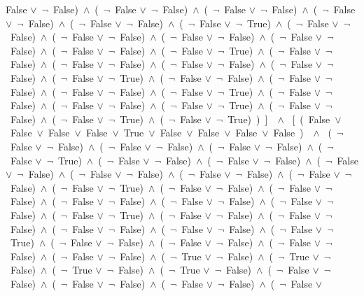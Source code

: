﻿\documentclass[a4paper,10pt]{article}
\begin{document}
False $\vee$\  $\neg$\ False)\ $\wedge$\ (\  $\neg$\ False $\vee$\  $\neg$\ False)\ $\wedge$\ (\  $\neg$\ False $\vee$\  $\neg$\ False)\ $\wedge$\ (\  $\neg$\ False $\vee$\  $\neg$\ False)\ $\wedge$\ (\  $\neg$\ False $\vee$\  $\neg$\ False)\ $\wedge$\ (\  $\neg$\ False $\vee$\  $\neg$\ True)\ $\wedge$\ (\  $\neg$\ False $\vee$\  $\neg$\ False)\ $\wedge$\ (\  $\neg$\ False $\vee$\  $\neg$\ False)\ $\wedge$\ (\  $\neg$\ False $\vee$\  $\neg$\ False)\ $\wedge$\ (\  $\neg$\ False $\vee$\  $\neg$\ False)\ $\wedge$\ (\  $\neg$\ False $\vee$\  $\neg$\ False)\ $\wedge$\ (\  $\neg$\ False $\vee$\  $\neg$\ True)\ $\wedge$\ (\  $\neg$\ False $\vee$\  $\neg$\ False)\ $\wedge$\ (\  $\neg$\ False $\vee$\  $\neg$\ False)\ $\wedge$\ (\  $\neg$\ False $\vee$\  $\neg$\ False)\ $\wedge$\ (\  $\neg$\ False $\vee$\  $\neg$\ False)\ $\wedge$\ (\  $\neg$\ False $\vee$\  $\neg$\ True)\ $\wedge$\ (\  $\neg$\ False $\vee$\  $\neg$\ False)\ $\wedge$\ (\  $\neg$\ False $\vee$\  $\neg$\ False)\ $\wedge$\ (\  $\neg$\ False $\vee$\  $\neg$\ False)\ $\wedge$\ (\  $\neg$\ False $\vee$\  $\neg$\ True)\ $\wedge$\ (\  $\neg$\ False $\vee$\  $\neg$\ False)\ $\wedge$\ (\  $\neg$\ False $\vee$\  $\neg$\ False)\ $\wedge$\ (\  $\neg$\ False $\vee$\  $\neg$\ True)\ $\wedge$\ (\  $\neg$\ False $\vee$\  $\neg$\ False)\ $\wedge$\ (\  $\neg$\ False $\vee$\  $\neg$\ True)\ $\wedge$\ (\  $\neg$\ False $\vee$\  $\neg$\ True)\ )\ ]\ \ $\wedge$ \ [\ (\ False\ $\vee$\ False\ $\vee$\ False\ $\vee$\ False\ $\vee$\ True\ $\vee$\ False\ $\vee$\ False\ $\vee$\ False\ $\vee$\ False\ )\ \ $\wedge$ \ (\  $\neg$\ False $\vee$\  $\neg$\ False)\ $\wedge$\ (\  $\neg$\ False $\vee$\  $\neg$\ False)\ $\wedge$\ (\  $\neg$\ False $\vee$\  $\neg$\ False)\ $\wedge$\ (\  $\neg$\ False $\vee$\  $\neg$\ True)\ $\wedge$\ (\  $\neg$\ False $\vee$\  $\neg$\ False)\ $\wedge$\ (\  $\neg$\ False $\vee$\  $\neg$\ False)\ $\wedge$\ (\  $\neg$\ False $\vee$\  $\neg$\ False)\ $\wedge$\ (\  $\neg$\ False $\vee$\  $\neg$\ False)\ $\wedge$\ (\  $\neg$\ False $\vee$\  $\neg$\ False)\ $\wedge$\ (\  $\neg$\ False $\vee$\  $\neg$\ False)\ $\wedge$\ (\  $\neg$\ False $\vee$\  $\neg$\ True)\ $\wedge$\ (\  $\neg$\ False $\vee$\  $\neg$\ False)\ $\wedge$\ (\  $\neg$\ False $\vee$\  $\neg$\ False)\ $\wedge$\ (\  $\neg$\ False $\vee$\  $\neg$\ False)\ $\wedge$\ (\  $\neg$\ False $\vee$\  $\neg$\ False)\ $\wedge$\ (\  $\neg$\ False $\vee$\  $\neg$\ False)\ $\wedge$\ (\  $\neg$\ False $\vee$\  $\neg$\ True)\ $\wedge$\ (\  $\neg$\ False $\vee$\  $\neg$\ False)\ $\wedge$\ (\  $\neg$\ False $\vee$\  $\neg$\ False)\ $\wedge$\ (\  $\neg$\ False $\vee$\  $\neg$\ False)\ $\wedge$\ (\  $\neg$\ False $\vee$\  $\neg$\ False)\ $\wedge$\ (\  $\neg$\ False $\vee$\  $\neg$\ True)\ $\wedge$\ (\  $\neg$\ False $\vee$\  $\neg$\ False)\ $\wedge$\ (\  $\neg$\ False $\vee$\  $\neg$\ False)\ $\wedge$\ (\  $\neg$\ False $\vee$\  $\neg$\ False)\ $\wedge$\ (\  $\neg$\ False $\vee$\  $\neg$\ False)\ $\wedge$\ (\  $\neg$\ True $\vee$\  $\neg$\ False)\ $\wedge$\ (\  $\neg$\ True $\vee$\  $\neg$\ False)\ $\wedge$\ (\  $\neg$\ True $\vee$\  $\neg$\ False)\ $\wedge$\ (\  $\neg$\ True $\vee$\  $\neg$\ False)\ $\wedge$\ (\  $\neg$\ False $\vee$\  $\neg$\ False)\ $\wedge$\ (\  $\neg$\ False $\vee$\  $\neg$\ False)\ $\wedge$\ (\  $\neg$\ False $\vee$\  $\neg$\ False)\ $\wedge$\ (\  $\neg$\ False $\vee$\ 
\end{document}

